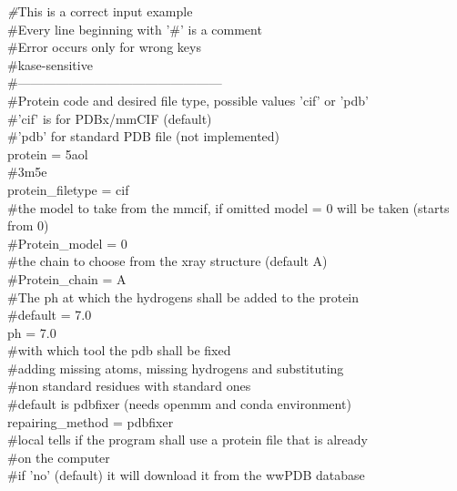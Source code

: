					{\textit \#This is a correct input example\\
					\#Every line beginning with '\#' is a comment\\
					\#Error occurs only for wrong keys\\
					\#kase-sensitive\\
					\#------------------------------------------------\\
					$\ $\\
					\#Protein code and desired file type, possible values 'cif' or 'pdb'\\
					\#'cif' is for PDBx/mmCIF (default)\\
					\#'pdb' for standard PDB file (not implemented)\\
					$\ $\\
					protein = 5aol\\
					\#3m5e\\
					protein\_filetype = cif\\
					$\ $\\
					\#the model to take from the mmcif, if omitted model = 0 will be taken (starts from 0)\\
					\#Protein\_model = 0\\
					\#the chain to choose from the xray structure (default A)\\
					\#Protein\_chain = A\\
					$\ $\\
					\#The ph at which the hydrogens shall be added to the protein\\
					\#default = 7.0\\
					ph = 7.0\\
					$\ $\\
					\#with which tool the pdb shall be fixed\\
					\#adding missing atoms, missing hydrogens and substituting\\
					\#non standard residues with standard ones\\
					\#default is pdbfixer (needs openmm and conda environment)\\
					$\ $\\
					repairing\_method = pdbfixer\\
					$\ $\\
					\#local tells if the program shall use a protein file that is already\\
					\#on the computer\\
					\#if 'no' (default) it will download it from the wwPDB database\\
}
